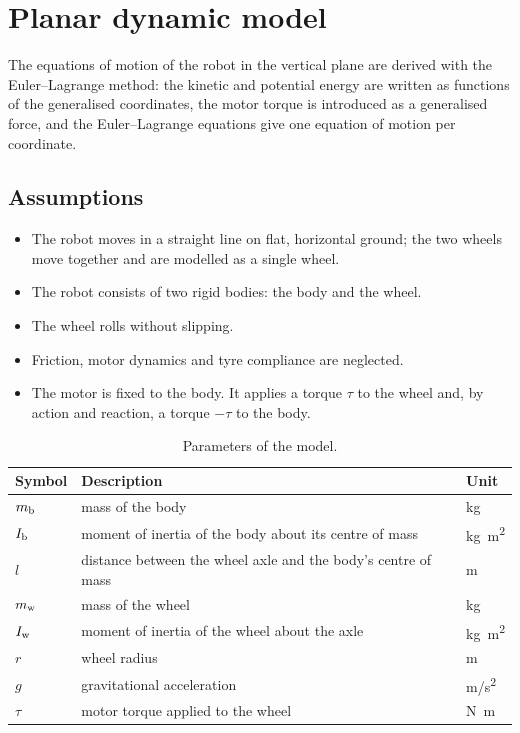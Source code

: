 \section{Planar dynamic model}\label{sec:model}

The equations of motion of the robot in the vertical plane are derived with
the Euler--Lagrange method: the kinetic and potential energy are written as
functions of the generalised coordinates, the motor torque is introduced as a
generalised force, and the Euler--Lagrange equations give one equation of
motion per coordinate.

\subsection{Assumptions}

\begin{itemize}
  \item The robot moves in a straight line on flat, horizontal ground; the two
        wheels move together and are modelled as a single wheel.
  \item The robot consists of two rigid bodies: the body and the wheel.
  \item The wheel rolls without slipping.
  \item Friction, motor dynamics and tyre compliance are neglected.
  \item The motor is fixed to the body. It applies a torque $\tau$ to the
        wheel and, by action and reaction, a torque $-\tau$ to the body.
\end{itemize}

\begin{table}[h]
\centering
\caption{Parameters of the model.}
\label{tab:params}
\begin{tabular}{@{}lll@{}}
\toprule
Symbol & Description & Unit \\
\midrule
$m_{\mathrm b}$ & mass of the body & \si{kg} \\
$I_{\mathrm b}$ & moment of inertia of the body about its centre of mass & \si{kg.m^2} \\
$l$   & distance between the wheel axle and the body's centre of mass & \si{m} \\
$m_{\mathrm w}$ & mass of the wheel & \si{kg} \\
$I_{\mathrm w}$ & moment of inertia of the wheel about the axle & \si{kg.m^2} \\
$r$   & wheel radius & \si{m} \\
$g$   & gravitational acceleration & \si{m/s^2} \\
$\tau$ & motor torque applied to the wheel & \si{N.m} \\
\bottomrule
\end{tabular}
\end{table}

